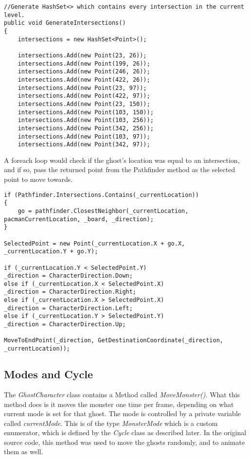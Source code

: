 \begin{lstlisting}[caption=generate intersections,label=intersections]
//Generate HashSet<> which contains every intersection in the current level.
public void GenerateIntersections()
{
	intersections = new HashSet<Point>();

	intersections.Add(new Point(23, 26));
	intersections.Add(new Point(199, 26));
	intersections.Add(new Point(246, 26));
	intersections.Add(new Point(422, 26));
	intersections.Add(new Point(23, 97));
	intersections.Add(new Point(422, 97));
	intersections.Add(new Point(23, 150));
	intersections.Add(new Point(103, 150));
	intersections.Add(new Point(103, 256));
	intersections.Add(new Point(342, 256));
	intersections.Add(new Point(103, 97));
	intersections.Add(new Point(342, 97));

\end{lstlisting}

A foreach loop would check if the ghost’s location was equal to an intersection, and if so, pass the returned point from the Pathfinder method as the selected point to move towards.

\begin{lstlisting}[caption=pathfinder call,label=lst:pathfinderCall]
if (Pathfinder.Intersections.Contains(_currentLocation))
{
	go = pathfinder.ClosestNeighbor(_currentLocation, pacmanCurrentLocation, _board, _direction);
}

SelectedPoint = new Point(_currentLocation.X + go.X, _currentLocation.Y + go.Y);

if (_currentLocation.Y < SelectedPoint.Y)
_direction = CharacterDirection.Down;
else if (_currentLocation.X < SelectedPoint.X)
_direction = CharacterDirection.Right;
else if (_currentLocation.X > SelectedPoint.X)
_direction = CharacterDirection.Left;
else if (_currentLocation.Y > SelectedPoint.Y)
_direction = CharacterDirection.Up;

MoveToEndPoint(_direction, GetDestinationCoordinate(_direction, _currentLocation));
\end{lstlisting}

\subsection{Modes and Cycle}\label{ssec:modesCycle}
The \emph{GhostCharacter} class contains a Method called \emph{MoveMonster()}. What this method does is it moves the monster one time per frame, depending on what current mode is set for that ghost. The mode is controlled by a private variable called \emph{currentMode}. This is of the type \emph{MonsterMode} which is a custom enumerator, which is defined by the \emph{Cycle} class as described later. In the original source code, this method was used to move the ghosts randomly, and to animate them as well.

